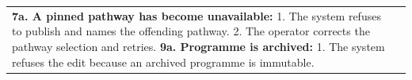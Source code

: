 \begin{longtable}{|>{\raggedright\arraybackslash}p{}|>{\raggedright\arraybackslash}p{}|}
\textbf{7a. A pinned pathway has become unavailable:} \newline
\hspace*{1em}1. The system refuses to publish and names the offending pathway. \newline
\hspace*{1em}2. The operator corrects the pathway selection and retries. \newline
\textbf{9a. Programme is archived:} \newline
\hspace*{1em}1. The system refuses the edit because an archived programme is immutable. \\
\end{longtable}

\renewcommand{\arraystretch}{1.12}
